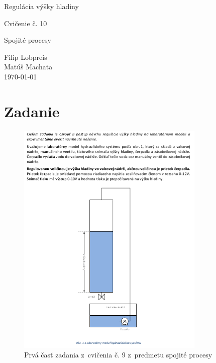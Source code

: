 \documentclass{article}
\begin{document}
\begin{titlepage}
	\null\vfill

	\begin{center}
		{\Huge Regulácia výšky hladiny }
		\vskip 2cm

		{\Large Cvičenie č. 10}
		\vskip 0.5cm

		{\large Spojité procesy}
	\end{center}

	\vfill
	\vfill

	\begin{flushright}
		Filip Lobpreis \\
		Matúš Machata \\
		\small\today\\
	\end{flushright}
	\hfill
\end{titlepage}

\thispagestyle{empty}
\clearpage

\tableofcontents
\thispagestyle{empty}
\clearpage

\section{Zadanie}
\label{sec:zadanie}

\begin{figure}[!htbp]
	\begin{center}
		\includegraphics[width=0.8\textwidth]{./include/zadaniep1.png}
	\end{center}
	\caption{Prvá časť zadania z~cvičenia č. 9 z~predmetu spojité procesy}
	\label{fig:zadanie1}
\end{figure}
\end{document}
